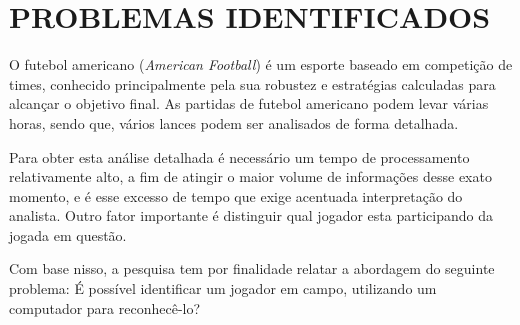 \chapter{PROBLEMAS IDENTIFICADOS}


\onehalfspacing O futebol americano (\textit{American Football}) é um esporte baseado em competição de times, conhecido principalmente pela sua robustez e estratégias calculadas para alcançar o objetivo final. As partidas de futebol americano podem levar várias horas, sendo que, vários lances podem ser analisados de forma detalhada.

\noindent Para obter esta análise detalhada é necessário um tempo de processamento relativamente alto, a fim de atingir o maior volume de informações desse exato momento, e é esse excesso de tempo que exige acentuada interpretação do analista. Outro fator importante é distinguir qual jogador esta participando da jogada em questão.

\noindent Com base nisso, a pesquisa tem por finalidade relatar a abordagem do seguinte problema: É possível identificar um jogador em campo, utilizando um computador para reconhecê-lo?







\vspace{0.1in}\noindent
